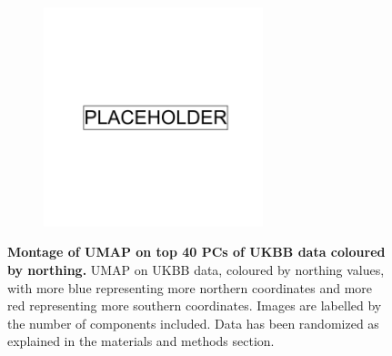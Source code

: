 \begin{figure}[ht]
    \centering
    \begin{subfigure}{0.95\textwidth}
    \includegraphics[width=0.7\textwidth]{placeholder.png}
    \end{subfigure}
    \caption[Montage of UMAP on top 40 PCs of UKBB data coloured by northing]{\textbf{Montage of UMAP on top 40 PCs of UKBB data coloured by northing.} UMAP on UKBB data, coloured by northing values, with more blue representing more northern coordinates and more red representing more southern coordinates. Images are labelled by the number of components included. Data has been randomized as explained in the materials and methods section.}
    \label{fig:supp_montage_ukbb_ns}
\end{figure}

\newpage


